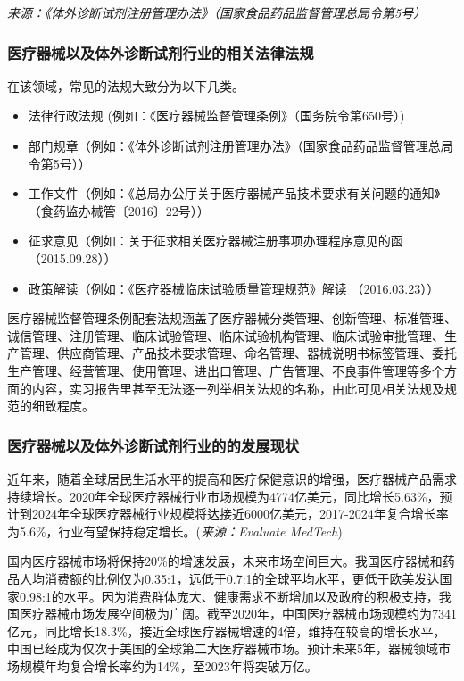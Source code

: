 \documentclass[cn,black,12pt,normal]{elegantnote}
\begin{document}
\textit{来源：《体外诊断试剂注册管理办法》（国家食品药品监督管理总局令第5号）}



\subsubsection{医疗器械以及体外诊断试剂行业的相关法律法规}
在该领域，常见的法规大致分为以下几类。
\begin{itemize}
    \item 法律行政法规 (例如：《医疗器械监督管理条例》（国务院令第650号）)
    \item 部门规章（例如：《体外诊断试剂注册管理办法》（国家食品药品监督管理总局令第5号））
    \item 工作文件（例如：《总局办公厅关于医疗器械产品技术要求有关问题的通知》（食药监办械管〔2016〕22号））
    \item 征求意见（例如：关于征求相关医疗器械注册事项办理程序意见的函（2015.09.28））
    \item 政策解读（例如：《医疗器械临床试验质量管理规范》解读 （2016.03.23））
\end{itemize}

医疗器械监督管理条例配套法规涵盖了医疗器械分类管理、创新管理、标准管理、诚信管理、注册管理、临床试验管理、临床试验机构管理、临床试验审批管理、生产管理、供应商管理、产品技术要求管理、命名管理、器械说明书标签管理、委托生产管理、经营管理、使用管理、进出口管理、广告管理、不良事件管理等多个方面的内容，实习报告里甚至无法逐一列举相关法规的名称，由此可见相关法规及规范的细致程度。

\subsubsection{医疗器械以及体外诊断试剂行业的的发展现状}
近年来，随着全球居民生活水平的提高和医疗保健意识的增强，医疗器械产品需求持续增长。2020年全球医疗器械行业市场规模为4774亿美元，同比增长5.63\%，预计到2024年全球医疗器械行业规模将达接近6000亿美元，2017-2024年复合增长率为5.6\%，行业有望保持稳定增长。(\textit{来源：Evaluate MedTech})

国内医疗器械市场将保持20\%的增速发展，未来市场空间巨大。我国医疗器械和药品人均消费额的比例仅为0.35:1，远低于0.7:1的全球平均水平，更低于欧美发达国家0.98:1的水平。因为消费群体庞大、健康需求不断增加以及政府的积极支持，我国医疗器械市场发展空间极为广阔。截至2020年，中国医疗器械市场规模约为7341亿元，同比增长18.3\%，接近全球医疗器械增速的4倍，维持在较高的增长水平，中国已经成为仅次于美国的全球第二大医疗器械市场。预计未来5年，器械领域市场规模年均复合增长率约为14\%，至2023年将突破万亿。
\end{document}
